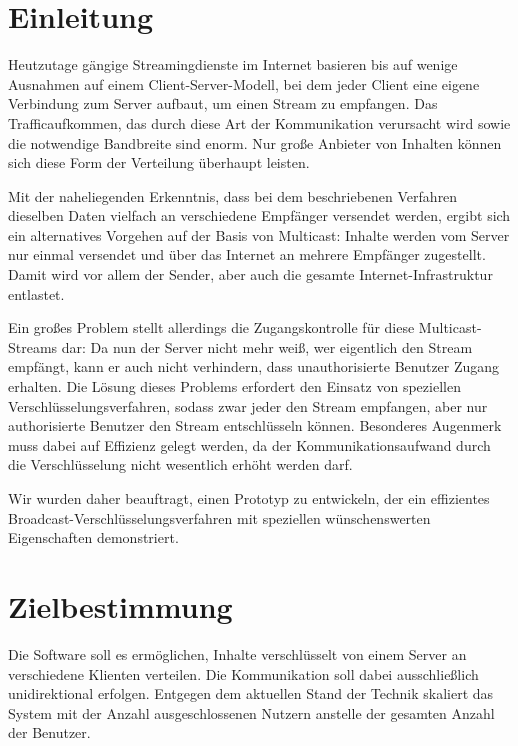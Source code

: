 \documentclass[a4paper,10pt]{article}
\title{\doctitle}
\author{\authorName}
\date{\today}
\begin{document}

\tableofcontents

\clearpage
\section{Einleitung}

Heutzutage gängige Streamingdienste im Internet basieren bis auf wenige Ausnahmen auf
einem Client-Server-Modell, bei dem jeder Client eine eigene Verbindung zum Server
aufbaut, um einen Stream zu empfangen. Das Trafficaufkommen, das durch diese Art der
Kommunikation verursacht wird sowie die notwendige Bandbreite sind enorm. Nur große
Anbieter von Inhalten können sich diese Form der Verteilung überhaupt leisten.

Mit der naheliegenden Erkenntnis, dass bei dem beschriebenen Verfahren dieselben Daten
vielfach an verschiedene Empfänger versendet werden, ergibt sich ein alternatives
Vorgehen auf der Basis von Multicast: Inhalte werden vom Server nur einmal versendet
und über das Internet an mehrere Empfänger zugestellt. Damit wird vor allem der Sender,
aber auch die gesamte Internet-Infrastruktur entlastet.

Ein großes Problem stellt allerdings die Zugangskontrolle für diese Multicast-Streams
dar: Da nun der Server nicht mehr weiß, wer eigentlich den Stream empfängt, kann
er auch nicht verhindern, dass unauthorisierte Benutzer Zugang erhalten. Die Lösung
dieses Problems erfordert den Einsatz von speziellen Verschlüsselungsverfahren,
sodass zwar jeder den Stream empfangen, aber nur authorisierte Benutzer den Stream
entschlüsseln können. Besonderes Augenmerk muss dabei auf Effizienz gelegt werden,
da der Kommunikationsaufwand durch die Verschlüsselung nicht wesentlich erhöht werden
darf.

Wir wurden daher beauftragt, einen Prototyp zu entwickeln, der ein effizientes
Broadcast-Verschlüsselungsverfahren mit speziellen wünschenswerten Eigenschaften
demonstriert.

\section{Zielbestimmung}
Die Software soll es ermöglichen, Inhalte verschlüsselt von einem Server an verschiedene Klienten verteilen. Die Kommunikation soll dabei ausschließlich unidirektional erfolgen.
Entgegen dem aktuellen Stand der Technik skaliert das System mit der Anzahl ausgeschlossenen Nutzern anstelle der gesamten Anzahl der Benutzer.
\end{document}
